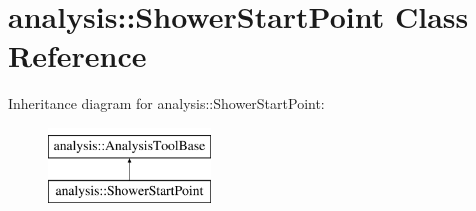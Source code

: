 \hypertarget{classanalysis_1_1ShowerStartPoint}{}\section{analysis\+:\+:Shower\+Start\+Point Class Reference}
\label{classanalysis_1_1ShowerStartPoint}
Inheritance diagram for analysis\+:\+:Shower\+Start\+Point\+:\begin{figure}[H]
\begin{center}
\leavevmode
\includegraphics[height=2.000000cm]{classanalysis_1_1ShowerStartPoint}
\end{center}
\end{figure}
